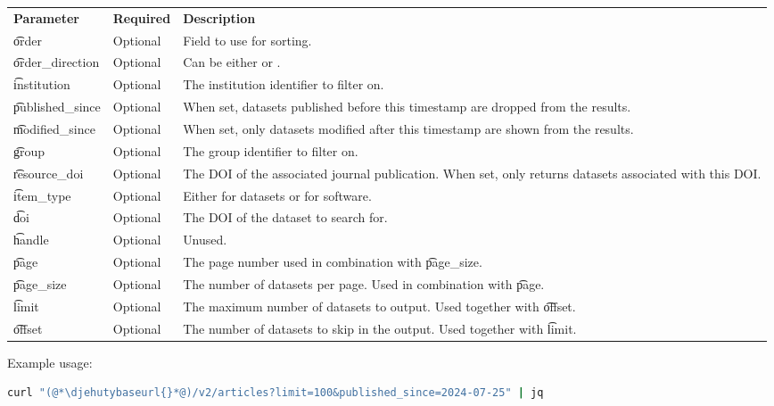 \begin{tabularx}{\textwidth}{*{2}{!{\VRule[-1pt]}l}!{\VRule[-1pt]}X}
  \headrow
  \textbf{Parameter}   & \textbf{Required} & \textbf{Description}\\
  \t{order}            & Optional & Field to use for sorting.\\
  \t{order\_direction} & Optional & Can be either  or .\\
  \t{institution}      & Optional & The institution identifier to filter on.\\
  \t{published\_since} & Optional & When set, datasets published before this
                                    timestamp are dropped from the results.\\
  \t{modified\_since}  & Optional & When set, only datasets modified after
                                    this timestamp are shown from the results.\\
  \t{group}            & Optional & The group identifier to filter on.\\
  \t{resource\_doi}    & Optional & The DOI of the associated journal publication.
                                    When set, only returns datasets associated
                                    with this DOI.\\
  \t{item\_type}       & Optional & Either  for datasets or 
                                    for software.\\
  \t{doi}              & Optional & The DOI of the dataset to search for.\\
  \t{handle}           & Optional & Unused.\\
  \t{page}             & Optional & The page number used in combination with
                                    \t{page\_size}.\\
  \t{page\_size}       & Optional & The number of datasets per page.  Used
                                    in combination with \t{page}.\\
  \t{limit}            & Optional & The maximum number of datasets to output.
                                    Used together with \t{offset}.\\
  \t{offset}           & Optional & The number of datasets to skip in the
                                    output.  Used together with \t{limit}.\\
\end{tabularx}

  Example usage:
\begin{lstlisting}[language=bash]
curl "(@*\djehutybaseurl{}*@)/v2/articles?limit=100&published_since=2024-07-25" | jq
\end{lstlisting}

